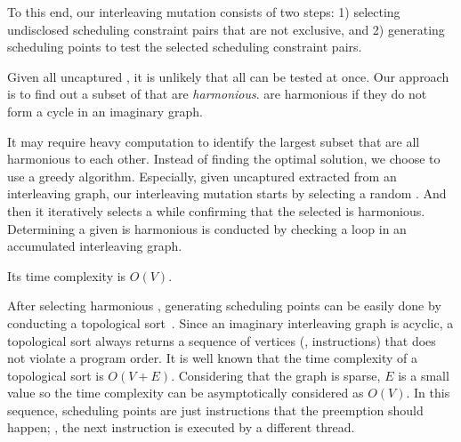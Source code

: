 To this end, our interleaving mutation consists of two steps:
%
1) selecting undisclosed scheduling constraint pairs that are not
exclusive, and 2) generating scheduling points to test the selected
scheduling constraint pairs.


%
Given all uncaptured \segments, it is unlikely that all \segments can
be tested at once.
%
Our approach is to find out a subset of \segments that are
\textit{harmonious}. \Segments are harmonious if they do not form a
cycle in an imaginary graph.


It may require heavy computation to identify the largest subset that
are all harmonious to each other.
%
Instead of finding the optimal solution, we choose to use a greedy
algorithm.
%
Especially, given uncaptured \segments extracted from an interleaving
graph, our interleaving mutation starts by selecting a random
\segment.
%
And then it iteratively selects a \segment while confirming that the
selected \segment is harmonious.
%
Determining a given \segment is harmonious is conducted by checking a
loop in an accumulated interleaving graph.

Its time complexity is $O(V)$.


%
After selecting harmonious \segments, generating scheduling points can
be easily done by conducting a topological
sort~\cite{topologicalsort}.
%
Since an imaginary interleaving graph is acyclic, a topological sort
always returns a sequence of vertices (\ie, instructions) that does
not violate a program order.
%
It is well known that the time complexity of a topological sort is
$O(V+E)$. Considering that the graph is sparse, $E$ is a small value
so the time complexity can be asymptotically considered as $O(V)$.
%
In this sequence, scheduling points are just instructions that the
preemption should happen; \ie, the next instruction is executed by a
different thread.
%




